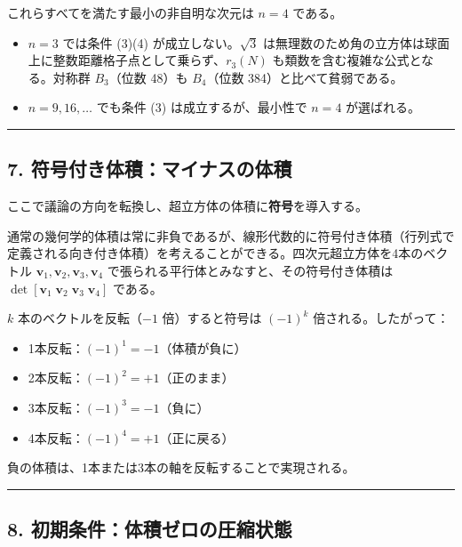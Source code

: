 \documentclass[a4paper,11pt]{ltjsarticle}
\theoremstyle{definition}
\providecommand{\tightlist}{\setlength{\itemsep}{0pt}\setlength{\parskip}{0pt}}
\begin{document}
これらすべてを満たす最小の非自明な次元は \textbf{\(n = 4\)} である。

\begin{itemize}
\tightlist
\item
  \(n = 3\) では条件 (3)(4) が成立しない。\(\sqrt{3}\)
  は無理数のため角の立方体は球面上に整数距離格子点として乗らず、\(r_3(N)\)
  も類数を含む複雑な公式となる。対称群 \(B_3\)（位数 48）も
  \(B_4\)（位数 384）と比べて貧弱である。
\item
  \(n = 9, 16, \ldots\) でも条件 (3) は成立するが、最小性で \(n = 4\)
  が選ばれる。
\end{itemize}

\begin{center}\rule{0.5\linewidth}{0.5pt}\end{center}

\subsection{7.
符号付き体積：マイナスの体積}\label{ux7b26ux53f7ux4ed8ux304dux4f53ux7a4dux30deux30a4ux30caux30b9ux306eux4f53ux7a4d}

ここで議論の方向を転換し、超立方体の体積に\textbf{符号}を導入する。

通常の幾何学的体積は常に非負であるが、線形代数的に符号付き体積（行列式で定義される向き付き体積）を考えることができる。四次元超立方体を4本のベクトル
\(\mathbf{v}_1, \mathbf{v}_2, \mathbf{v}_3, \mathbf{v}_4\)
で張られる平行体とみなすと、その符号付き体積は
\(\det[\mathbf{v}_1 \; \mathbf{v}_2 \; \mathbf{v}_3 \; \mathbf{v}_4]\)
である。

\(k\) 本のベクトルを反転（\(-1\) 倍）すると符号は \((-1)^k\)
倍される。したがって：

\begin{itemize}
\tightlist
\item
  1本反転：\((-1)^1 = -1\)（体積が負に）
\item
  2本反転：\((-1)^2 = +1\)（正のまま）
\item
  3本反転：\((-1)^3 = -1\)（負に）
\item
  4本反転：\((-1)^4 = +1\)（正に戻る）
\end{itemize}

負の体積は、1本または3本の軸を反転することで実現される。

\begin{center}\rule{0.5\linewidth}{0.5pt}\end{center}

\subsection{8.
初期条件：体積ゼロの圧縮状態}\label{ux521dux671fux6761ux4ef6ux4f53ux7a4dux30bcux30edux306eux5727ux7e2eux72b6ux614b}
\end{document}
